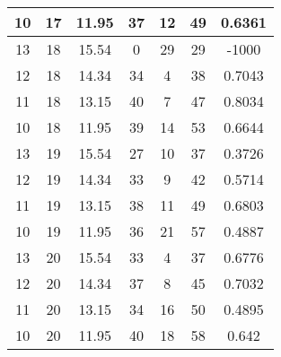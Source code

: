 \documentclass[letterpaper, 12pt]{article}
\begin{document}
\begin{longtable}{|c|c|c|c|c|c|c|}
10 & 17 & 11.95 & 37 & 12 & 49 & 0.6361 \\
\hline
13 & 18 & 15.54 & 0 & 29 & 29 & -1000 \\
\hline
12 & 18 & 14.34 & 34 & 4 & 38 & 0.7043 \\
\hline
11 & 18 & 13.15 & 40 & 7 & 47 & 0.8034 \\
\hline
10 & 18 & 11.95 & 39 & 14 & 53 & 0.6644 \\
\hline
13 & 19 & 15.54 & 27 & 10 & 37 & 0.3726 \\
\hline
12 & 19 & 14.34 & 33 & 9 & 42 & 0.5714 \\
\hline
11 & 19 & 13.15 & 38 & 11 & 49 & 0.6803 \\
\hline
10 & 19 & 11.95 & 36 & 21 & 57 & 0.4887 \\
\hline
13 & 20 & 15.54 & 33 & 4 & 37 & 0.6776 \\
\hline
12 & 20 & 14.34 & 37 & 8 & 45 & 0.7032 \\
\hline
11 & 20 & 13.15 & 34 & 16 & 50 & 0.4895 \\
\hline
10 & 20 & 11.95 & 40 & 18 & 58 & 0.642 \\
\hline
\end{longtable}
\end{document}
